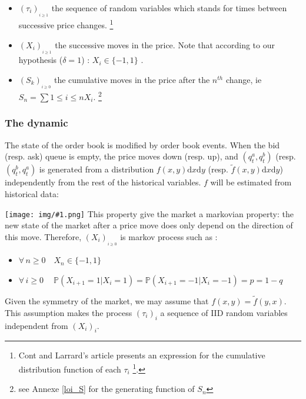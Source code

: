 \documentclass{article}
\newcommand{\IMG}[1] { \texttt{[image: img/\#1.png]} }
\begin{document}
\begin{itemize}
\item $(\tau_i)_{_{i \geq 1}}$ the sequence of random variables  which stands for times between successive price changes. \footnote { Cont and Larrard's article presents an expression for the cumulative distribution function of each $\tau_i$ \footnote{See equations (3)-(4) of Cont and Larrard's article}. }
\item $(X_i)_{_{i \geq 1}}$ the successive moves in the price. Note that according to our hypothesis ($\delta = 1$) : $X_i \in \{-1,1\}$ .
\item $(S_k)_{_{i \geq 0}}$ the cumulative moves in the price after the $n^{th}$ change, ie $S_n = \sum{1 \leq i \leq n } X_i$. \footnote{ see Annexe \ref{loi_S} for the generating function of $S_n$ }  
\end{itemize}

\subsubsection{The dynamic}

The state  of the order book is modified by order book events. When the bid (resp. ask) queue is empty, the price moves down (resp. up), and $(q_t^a, q_t^b)$ (resp.$ (q_t^b, q_t^a)$ is generated from a distribution $f(x, y) \mathrm{d}x \mathrm{d}y $ (resp. $\tilde f(x, y) \mathrm{d}x \mathrm{d}y $) independently from the rest of the historical variables.
$f$ will be estimated from historical data:

\IMG{hist_f}
This property give the market a markovian property: the new state of the market after a price move does only depend on the direction of this move.
Therefore,  $(X_i)_{_{i \geq 0}}$ is markov process such as :
\begin{itemize}
\item $\forall \, n\geq0 \quad X_{n} \in \{-1,1\} $ 
\item $\forall \, i\geq0 \quad\ \mathbb{P}( X_{i+1}=1 | X_i=1 ) = \mathbb{P}( X_{i+1}=-1 | X_i=-1 ) = p = 1-q$
\end{itemize}
Given the symmetry of the market, we may assume that $f(x, y) = \tilde f(y, x)$. This assumption makes the process $(\tau_i)_i$ a sequence of IID random variables independent from $(X_i)_i$.
\end{document}
